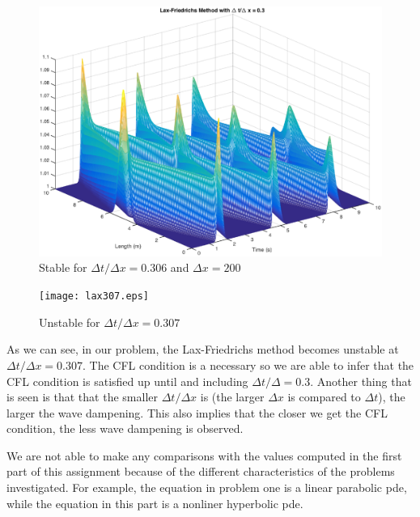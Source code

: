 \begin{figure}
\begin{center}
\includegraphics[scale=0.6]{lax03.eps}
\caption{Stable for $\Delta t/ \Delta x=0.306$ and $\Delta x = 200$}
\label{reg}
\end{center}
\end{figure}

\begin{figure}
\begin{center}
\texttt{[image: lax307.eps]}
\caption{Unstable for $\Delta t /\Delta x=0.307$}
\end{center}
\end{figure}

As we can see, in our problem, the Lax-Friedrichs method becomes unstable at $\Delta t/\Delta x=0.307$. The CFL condition is a necessary so we are able to infer that the CFL condition is satisfied up until and including $\Delta t/\Delta = 0.3$. Another thing that is seen is that that the smaller $\Delta t/\Delta x$ is (the larger $\Delta x$ is compared to $\Delta t$), the larger the wave dampening. This also implies that the closer we get the CFL condition, the less wave dampening is observed. 

We are not able to make any comparisons with the values computed in the first part of this assignment because of the different characteristics of the problems investigated. For example, the equation in problem one is a linear parabolic pde, while the equation in this part is a nonliner hyperbolic pde. 

